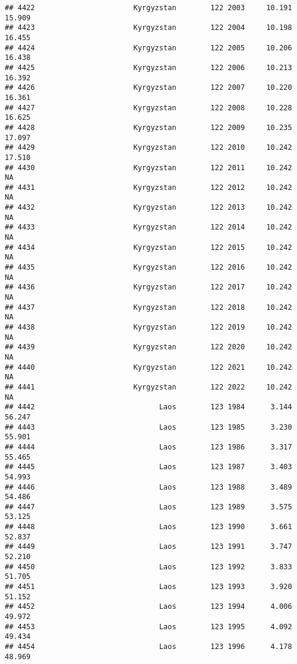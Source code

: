 \documentclass[
]{article}
\begin{document}
\begin{verbatim}
## 4422                       Kyrgyzstan        122 2003     10.191     15.909
## 4423                       Kyrgyzstan        122 2004     10.198     16.455
## 4424                       Kyrgyzstan        122 2005     10.206     16.438
## 4425                       Kyrgyzstan        122 2006     10.213     16.392
## 4426                       Kyrgyzstan        122 2007     10.220     16.361
## 4427                       Kyrgyzstan        122 2008     10.228     16.625
## 4428                       Kyrgyzstan        122 2009     10.235     17.097
## 4429                       Kyrgyzstan        122 2010     10.242     17.510
## 4430                       Kyrgyzstan        122 2011     10.242         NA
## 4431                       Kyrgyzstan        122 2012     10.242         NA
## 4432                       Kyrgyzstan        122 2013     10.242         NA
## 4433                       Kyrgyzstan        122 2014     10.242         NA
## 4434                       Kyrgyzstan        122 2015     10.242         NA
## 4435                       Kyrgyzstan        122 2016     10.242         NA
## 4436                       Kyrgyzstan        122 2017     10.242         NA
## 4437                       Kyrgyzstan        122 2018     10.242         NA
## 4438                       Kyrgyzstan        122 2019     10.242         NA
## 4439                       Kyrgyzstan        122 2020     10.242         NA
## 4440                       Kyrgyzstan        122 2021     10.242         NA
## 4441                       Kyrgyzstan        122 2022     10.242         NA
## 4442                             Laos        123 1984      3.144     56.247
## 4443                             Laos        123 1985      3.230     55.901
## 4444                             Laos        123 1986      3.317     55.465
## 4445                             Laos        123 1987      3.403     54.993
## 4446                             Laos        123 1988      3.489     54.486
## 4447                             Laos        123 1989      3.575     53.125
## 4448                             Laos        123 1990      3.661     52.837
## 4449                             Laos        123 1991      3.747     52.210
## 4450                             Laos        123 1992      3.833     51.705
## 4451                             Laos        123 1993      3.920     51.152
## 4452                             Laos        123 1994      4.006     49.972
## 4453                             Laos        123 1995      4.092     49.434
## 4454                             Laos        123 1996      4.178     48.969

\end{verbatim}
\end{document}
